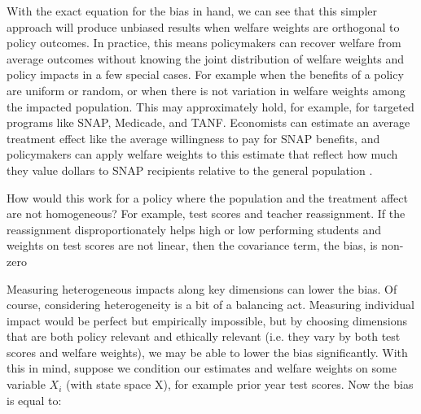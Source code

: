 \documentclass[12pt]{article}
\theoremstyle{definition}
\theoremstyle{definition}
\theoremstyle{definition}
\theoremstyle{definition}
\begin{document}
    With the exact equation for the bias in hand, we can see that this simpler approach will produce unbiased results when welfare weights are orthogonal to policy outcomes.   In practice, this means policymakers can recover welfare from average outcomes without knowing the joint distribution of welfare weights and policy impacts in a few special cases.  For example when the benefits of a policy are uniform or random, or when there is not variation in welfare weights among the impacted population. This may approximately hold, for example, for targeted programs like SNAP, Medicade, and TANF. Economists can estimate an average treatment effect like the average willingness to pay for SNAP benefits, and policymakers can apply welfare weights to this estimate that reflect how much they value dollars to SNAP recipients relative to the general population \citep{Keyser_2020}. 
    
    How would this work for a policy where the population and the treatment affect are not homogeneous?  For example, test scores and teacher reassignment. If the reassignment disproportionately helps high or low performing students and weights on test scores are not linear, then the covariance term, the bias, is non-zero

 Measuring heterogeneous impacts along key dimensions can lower the bias. Of course, considering heterogeneity is a bit of a balancing act. Measuring individual impact would be perfect but empirically impossible, but by choosing dimensions that are both policy relevant and ethically relevant (i.e. they vary by both test scores and welfare weights), we may be able to lower the bias significantly. With this in mind, suppose we condition our estimates and welfare weights on some variable $X_i$ (with state space X), for example prior year test scores. Now the bias is equal to:
\end{document}

